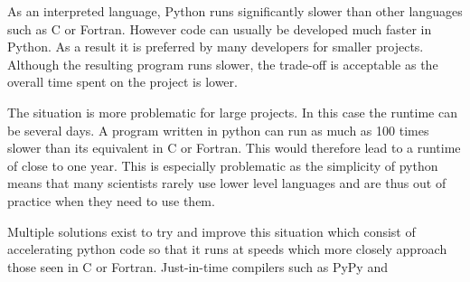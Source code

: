 
As an interpreted language, Python runs significantly slower than other languages such as C or Fortran. However code can usually be developed much faster in Python. As a result it is preferred by many developers for smaller projects. Although the resulting program runs slower, the trade-off is acceptable as the overall time spent on the project is lower.

The situation is more problematic for large projects. In this case the runtime can be several days. A program written in python can run as much as 100 times slower than its equivalent in C or Fortran. This would therefore lead to a runtime of close to one year. This is especially problematic as the simplicity of python means that many scientists rarely use lower level languages and are thus out of practice when they need to use them.

Multiple solutions exist to try and improve this situation which consist of accelerating python code so that it runs at speeds which more closely approach those seen in C or Fortran. Just-in-time compilers such as PyPy and 